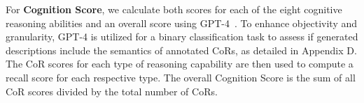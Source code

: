 For \textbf{Cognition Score}, we calculate both scores for each of the eight cognitive reasoning abilities and an overall score using GPT-4~\cite{openai2023gpt4}. To enhance objectivity and granularity, GPT-4 is utilized for a binary classification task to assess if generated descriptions include the semantics of annotated CoRs, as detailed in Appendix D. %
The CoR scores for each type of reasoning capability are then used to compute a recall score for each respective type. 
The overall Cognition Score is the sum of all CoR scores divided by the total number of CoRs.
